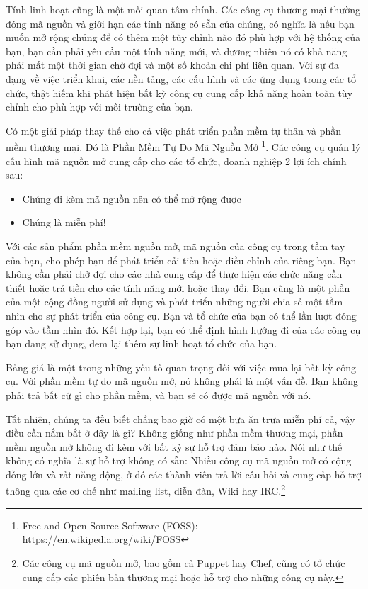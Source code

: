 Tính linh hoạt cũng là một mối quan tâm chính. Các công cụ thương mại thường đóng mã nguồn và giới hạn các tính năng có sẵn của chúng, có nghĩa là nếu bạn muốn mở rộng chúng để có thêm một tùy chỉnh nào đó phù hợp với hệ thống của bạn, bạn cần phải yêu cầu một tính năng mới, và đương nhiên nó có khả năng phải mất một thời gian chờ đợi và  một số khoản chi phí liên quan. Với sự đa dạng về việc triển khai, các nền tảng, các cấu hình và các ứng dụng trong các tổ chức, thật hiếm khi phát hiện bất kỳ công cụ cung cấp khả năng hoàn toàn tùy chỉnh cho phù hợp với môi trường của bạn.

Có một giải pháp thay thế cho cả việc phát triển phần mềm tự thân và phần mềm thương mại. Đó là Phần Mềm Tự Do Mã Nguồn Mở \footnote{Free and Open Source Software (FOSS): \url{https://en.wikipedia.org/wiki/FOSS}}. Các công cụ quản lý cấu hình mã nguồn mở cung cấp cho các tổ chức, doanh nghiệp 2 lợi ích chính sau:

\begin{itemize}
\item Chúng đi kèm mã nguồn nên có thể mở rộng được
\item Chúng là miễn phí!
\end{itemize}

Với các sản phẩm phần mềm nguồn mở, mã nguồn của công cụ trong tầm tay của bạn, cho phép bạn để phát triển cải tiến hoặc điều chỉnh của riêng bạn. Bạn không cần phải chờ đợi cho các nhà cung cấp để thực hiện các chức năng cần thiết hoặc trả tiền cho các tính năng mới hoặc thay đổi. Bạn cũng là một phần của một cộng đồng người sử dụng và phát triển những người chia sẻ một tầm nhìn cho sự phát triển của công cụ. Bạn và tổ chức của bạn có thể lần lượt đóng góp vào tầm nhìn đó. Kết hợp lại, bạn có thể định hình hướng đi của các công cụ bạn đang sử dụng, đem lại thêm sự linh hoạt tổ chức của bạn.

Bảng giá là một trong những yếu tố quan trọng đối với việc mua lại bất kỳ công cụ. Với phần mềm tự do mã nguồn mở, nó không phải là một vấn đề. Bạn không phải trả bất cứ gì cho phần mềm, và bạn sẽ có được mã nguồn với nó.

Tất nhiên, chúng ta đều biết chẳng bao giờ có một bữa ăn trưa miễn phí cả, vậy điều cần nắm bắt ở đây là gì? Không giống như phần mềm thương mại, phần mềm nguồn mở không đi kèm với bất kỳ sự hỗ trợ đảm bảo nào. Nói như thế không có nghĩa là sự hỗ trợ không có sẵn: Nhiều công cụ mã nguồn mở có cộng đồng lớn và rất năng động, ở đó các thành viên trả lời câu hỏi và cung cấp hỗ trợ thông qua các cơ chế như mailing list, diễn đàn, Wiki hay IRC.\footnote{Các công cụ mã nguồn mở, bao gồm cả Puppet hay Chef, cũng có tổ chức cung cấp các phiên bản thương mại hoặc hỗ trợ cho những công cụ này.}
